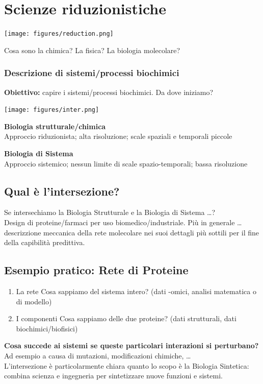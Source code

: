 \documentclass{article}
\begin{document}
\section{Scienze riduzionistiche}
\begin{center}
    \texttt{[image: figures/reduction.png]}
\end{center}
Cosa sono la chimica? La fisica? La biologia molecolare?
\subsubsection{Descrizione di sistemi/processi biochimici}
\textbf{Obiettivo:} capire i sistemi/processi biochimici. Da dove iniziamo?
\begin{center}
    \texttt{[image: figures/inter.png]}
\end{center}
\begin{minipage}[t]{.5\textwidth}
    \raggedright
    \textbf{Biologia strutturale/chimica}\\
    Approccio riduzionista; alta risoluzione; scale spaziali e temporali piccole
\end{minipage}%
\begin{minipage}[t]{.5\textwidth}
    \textbf{Biologia di Sistema}\\
    Approccio sistemico; nessun limite di scale spazio-temporali; bassa risoluzione
\end{minipage}
\subsection{Qual è l'intersezione?}
Se intersechiamo la Biologia Strutturale e la Biologia di Sistema \dots ?\\
Design di proteine/farmaci per uso biomedico/industriale. Più in generale \dots descrizzione meccanica della rete molecolare nei suoi dettagli più sottili per il fine della capibilità predittiva.
\subsection{Esempio pratico: Rete di Proteine}
\begin{enumerate}
    \item La rete
    \subitem  Cosa sappiamo del sistema intero? (dati -omici, analisi matematica o di modello)
    \item I componenti
    \subitem Cosa sappiamo delle due proteine? (dati strutturali, dati biochimici/biofisici)  
\end{enumerate}
\textbf{Cosa succede ai sistemi se queste particolari interazioni si perturbano?} Ad esempio a causa di mutazioni, modificazioni chimiche, \dots\\
L'intersezione è particolarmente chiara quanto lo scopo è la Biologia Sintetica: combina scienza e ingegneria per sintetizzare nuove funzioni e sistemi.
\end{document}
